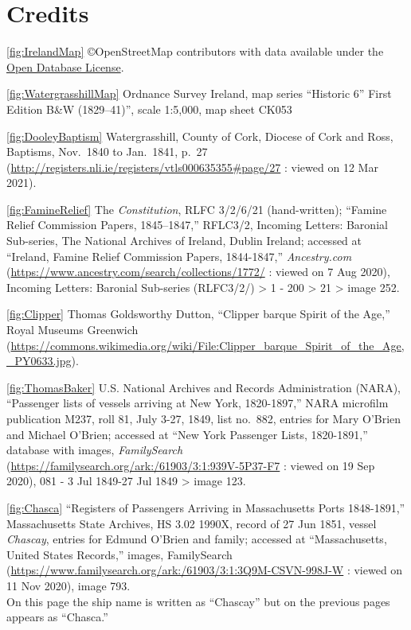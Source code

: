 
\chapter{Credits}
\raggedright
\setlength{\parskip}{1em}

\ref{fig:IrelandMap} \copyright OpenStreetMap contributors with data available under the \href{https://www.openstreetmap.org/copyright}{Open Database License}.

\ref{fig:WatergrasshillMap} Ordnance Survey Ireland, map series ``Historic 6'' First Edition B\&W (1829--41)'', scale 1:5,000, map sheet CK053

\ref{fig:DooleyBaptism} Watergrasshill, County of Cork, Diocese of Cork and Ross, Baptisms, Nov.\ 1840 to Jan.\ 1841, p.\ 27 (\url{http://registers.nli.ie/registers/vtls000635355\#page/27} : viewed on 12 Mar 2021).

\ref{fig:FamineRelief} The \textit{Constitution}, RLFC 3/2/6/21 (hand-written); ``Famine Relief Commission Papers, 1845–1847,'' RFLC3/2, Incoming Letters: Baronial Sub-series, The National Archives of Ireland, Dublin Ireland;
accessed at ``Ireland, Famine Relief Commission Papers, 1844-1847,'' \textit{Ancestry.com} (\url{https://www.ancestry.com/search/collections/1772/} : viewed on 7 Aug 2020), Incoming Letters: Baronial Sub-series (RLFC3/2/) > 1 - 200 > 21 > image 252.

\ref{fig:Clipper} Thomas Goldsworthy Dutton, ``Clipper barque Spirit of the Age,'' Royal Museums Greenwich (\url{https://commons.wikimedia.org/wiki/File:Clipper_barque_Spirit_of_the_Age,_PY0633.jpg}).

\ref{fig:ThomasBaker} U.S. National Archives and Records Administration (NARA), ``Passenger lists of vessels arriving at New York, 1820-1897,'' NARA microfilm publication M237, roll 81, July 3-27, 1849, list no.\ 882, entries for Mary O'Brien and Michael O'Brien; accessed at ``New York Passenger Lists, 1820-1891,'' database with images, \textit{FamilySearch} (\url{https://familysearch.org/ark:/61903/3:1:939V-5P37-F7} : viewed on 19 Sep 2020), 081 - 3 Jul 1849-27 Jul 1849 > image 123.

\ref{fig:Chasca} ``Registers of Passengers Arriving in Massachusetts Ports 1848-1891,'' Massachusetts State Archives, HS 3.02 1990X, record of 27 Jun 1851, vessel \textit{Chascay}, entries for Edmund O'Brien and family; accessed at ``Massachusetts, United States Records,'' images, FamilySearch (\url{https://www.familysearch.org/ark:/61903/3:1:3Q9M-CSVN-998J-W} : viewed on 11 Nov 2020), image 793.\\
On this page the ship name is written as ``Chascay'' but on the previous pages appears as ``Chasca.''

